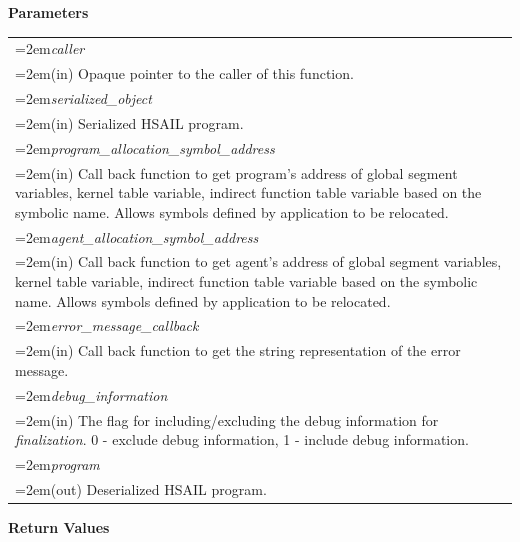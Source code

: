 \documentclass[final]{book}
\newcommand{\hsaarg}[1]{\textit{#1}}
\begin{document}
\noindent\textbf{Parameters}\\[-6mm]
\noindent\begin{longtable}{@{}>{\hangindent=2em}p{\textwidth}}
\hsaarg{caller}\\\hspace{2em}(in) Opaque pointer to the caller of this function.\\[2mm]
\hsaarg{serialized_\-object}\\\hspace{2em}(in) Serialized HSAIL program.\\[2mm]
\hsaarg{program_\-allocation_\-symbol_\-address}\\\hspace{2em}(in) Call back function to get program's address of global segment variables, kernel table variable, indirect function table variable based on the symbolic name. Allows symbols defined by application to be relocated.\\[2mm]
\hsaarg{agent_\-allocation_\-symbol_\-address}\\\hspace{2em}(in) Call back function to get agent's address of global segment variables, kernel table variable, indirect function table variable based on the symbolic name. Allows symbols defined by application to be relocated.\\[2mm]
\hsaarg{error_\-message_\-callback}\\\hspace{2em}(in) Call back function to get the string representation of the error message.\\[2mm]
\hsaarg{debug_\-information}\\\hspace{2em}(in) The flag for including/excluding the debug information for \textit{finalization}. 0 - exclude debug information, 1 - include debug information.\\[2mm]
\hsaarg{program}\\\hspace{2em}(out) Deserialized HSAIL program.
\end{longtable}
\vspace{-5mm}\noindent\textbf{Return Values}\\[-6mm]
\end{document}
